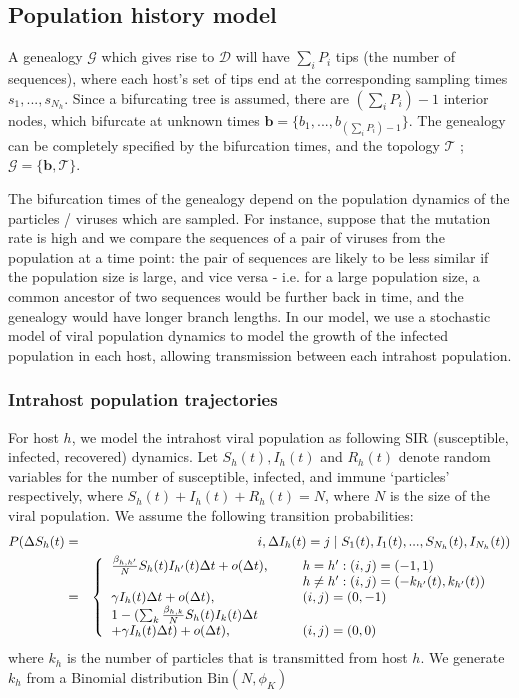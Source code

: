 \documentclass[a4paper,18pt]{report}
\begin{document}
\subsection{Population history model}
A genealogy $\mathcal{G}$ which gives rise to $\mathcal{D}$ will have $\sum_i P_i$ tips (the number of sequences), where each host's set of tips end at the corresponding sampling times $s_1,...,s_{N_h}$. Since a bifurcating tree is assumed, there are $(\sum_i P_i)-1$ interior nodes, which bifurcate at unknown times $\mathbf{b}=\{b_1,...,b_{(\sum_i P_i)-1}\}$. The genealogy can be completely specified by the bifurcation times, and the topology $\mathcal{T}$ ; $\mathcal{G}=\{\mathbf{b}, \mathcal{T}\}$. 

The bifurcation times of the genealogy depend on the population dynamics of the particles / viruses which are sampled. For instance,  suppose that the mutation rate is high and we compare the sequences of a pair of viruses from the population at a time point: the pair of sequences are likely to be less similar if the population size is large, and vice versa - i.e. for a large population size, a common ancestor of two sequences would be further back in time, and the genealogy would have longer branch lengths. In our model, we use a stochastic model of viral population dynamics to model the growth of the infected population in each host, allowing transmission between each intrahost population.
\subsubsection{Intrahost population trajectories}
For host $h$, we model the intrahost viral population as following SIR (susceptible, infected, recovered) dynamics. Let $S_h(t), I_h(t)$ and $R_h(t)$ denote random variables for the 
number of susceptible, infected, and immune `particles' respectively, where $S_h(t) + I_h(t) + R_h(t) = N$, where $N$ is the size of the viral population. We assume the following transition probabilities:
\begin{eqnarray}
P(\Delta S_h(t) &=& i, \Delta I_h(t) = j \mid S_1(t), I_1(t),..., S_{N_h}(t), I_{N_h}(t)) \label{eq:sirprocess}\\
&=& \left\{\begin{tabular}{l l l}
$\frac{\beta_{h,h'}}{N}S_h(t)I_{h'}(t)\Delta t + o(\Delta t)$, \hspace{0.4cm} & $h= h' : (i,j)=(-1,1)$ &  \\ 
& $h \neq h' : (i,j)=(-k_{h'}(t),k_{h'}(t))$ & \\
$\gamma I_h(t) \Delta t + o(\Delta t)$, & $(i,j)=(0,-1)$ & \nonumber\\
$1 - (\sum_k \frac{\beta_{h,k}}{N}S_h(t)I_k(t)\Delta t $ &  &\\
$+ \gamma I_h(t) \Delta t) + o(\Delta t)$, & $(i,j)=(0,0)$ &
\end{tabular}\right.
\end{eqnarray}
where $k_h$ is the number of particles that is transmitted from host $h$. We generate $k_h$ from a Binomial distribution $\textrm{Bin}(N, \phi_K)$
\end{document}
